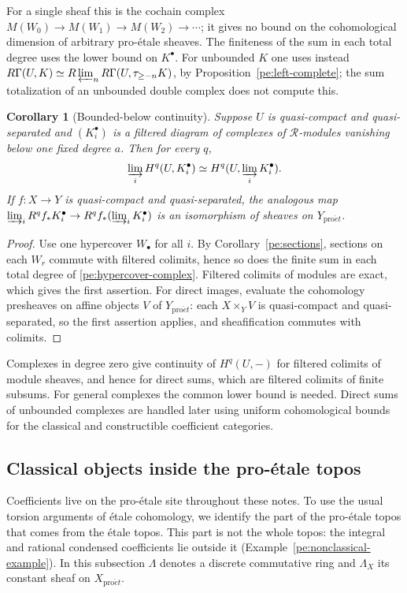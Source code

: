 \documentclass[11pt,a4paper]{article}
\numberwithin{equation}{section}
\newtheorem{corollary}[theorem]{Corollary}
\theoremstyle{definition}
\theoremstyle{remark}
\newcommand{\proet}{\mathrm{pro}\acute{e}t}
\begin{document}
For a single sheaf this is the cochain complex
$M(W_0)\to M(W_1)\to M(W_2)\to\cdots$; it gives no bound on the
cohomological dimension of arbitrary pro-\'etale sheaves. The
finiteness of the sum in each total degree uses the lower bound on
$K^\bullet$. For unbounded $K$ one uses instead
$R\Gamma(U,K)\simeq
R\varprojlim_n R\Gamma(U,\tau_{\geq-n}K)$, by
Proposition~\ref{pe:left-complete}; the sum totalization of an
unbounded double complex does not compute this.

\begin{corollary}[Bounded-below continuity]
\label{pe:bounded-continuity}
Suppose $U$ is quasi-compact and quasi-separated and
$(K_i^\bullet)$ is a filtered diagram of complexes of $\mathcal R$-modules
vanishing below one fixed degree $a$. Then for every $q$,
\[
 \varinjlim_i H^q(U,K_i^\bullet)
 \simeq H^q(U,\varinjlim_iK_i^\bullet).
\]
If $f:X\to Y$ is quasi-compact and quasi-separated, the analogous map
$\varinjlim_iR^qf_*K_i^\bullet\to
R^qf_*(\varinjlim_iK_i^\bullet)$ is an isomorphism of sheaves on
$Y_{\proet}$.
\end{corollary}
\begin{proof}
Use one hypercover $W_\bullet$ for all $i$. By
Corollary~\ref{pe:sections}, sections on each $W_r$ commute with
filtered colimits, hence so does the finite sum in each total degree
of \eqref{pe:hypercover-complex}. Filtered colimits of modules are
exact, which gives the first assertion. For direct images, evaluate the
cohomology presheaves on affine objects $V$ of $Y_{\proet}$: each
$X\times_YV$ is quasi-compact and quasi-separated, so the first
assertion applies, and sheafification commutes with colimits.
\end{proof}

Complexes in degree zero give continuity of $H^q(U,-)$ for filtered
colimits of module sheaves, and hence for direct sums, which are
filtered colimits of finite subsums. For general complexes the common
lower bound is needed. Direct sums of unbounded complexes
are handled later using uniform cohomological bounds for the classical
and constructible coefficient categories.

\subsection{Classical objects inside the pro-\'etale topos}
\label{pe:comparison-section}
Coefficients live on the pro-\'etale site throughout these notes. To
use the usual torsion arguments of \'etale cohomology, we identify the
part of the pro-\'etale topos that comes from the \'etale topos. This
part is not the whole topos: the integral and rational condensed
coefficients lie outside it (Example~\ref{pe:nonclassical-example}).
In this subsection $\Lambda$ denotes a discrete
commutative ring and $\Lambda_X$ its constant sheaf on $X_{\proet}$.
\end{document}
